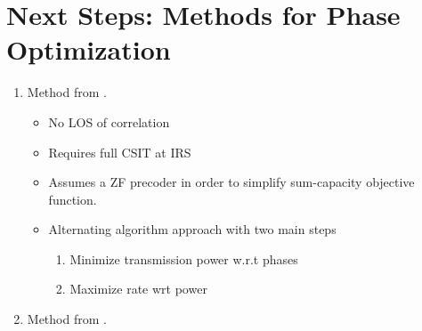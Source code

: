 \documentclass[12pt,a4paper]{report}
\begin{document}
\section{Next Steps: Methods for Phase Optimization}
\begin{enumerate}
\item
	Method from \cite{huang2018achievable}.
\begin{itemize}
\item
	No LOS of correlation
\item
	Requires full CSIT at IRS
\item 
	Assumes a ZF precoder in order to simplify sum-capacity objective function.
\item
	Alternating algorithm approach with two main steps
	\begin{enumerate}
	\item 
		Minimize transmission power w.r.t phases
	\item
		Maximize rate wrt power
	\end{enumerate}
\end{itemize}

\item 
	Method from \cite{huang2018achievable}.

\end{enumerate}

\end{document}
